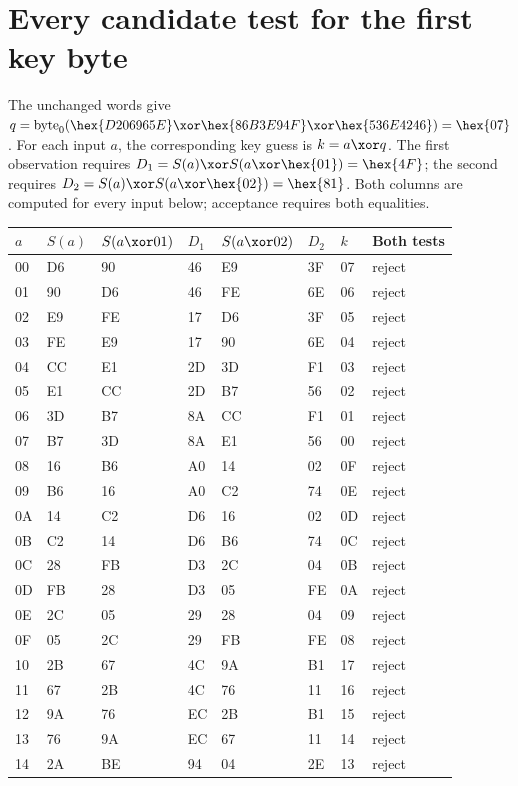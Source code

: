 \section{Every candidate test for the first key byte}
The unchanged words give $q=\operatorname{byte}_0(\hex{D206965E}\xor\hex{86B3E94F}\xor\hex{536E4246})=\hex{07}$. For each input $a$, the corresponding key guess is $k=a\xor q$. The first observation requires $D_1=S(a)\xor S(a\xor\hex{01})=\hex{4F}$; the second requires $D_2=S(a)\xor S(a\xor\hex{02})=\hex{81}$. Both columns are computed for every input below; acceptance requires both equalities.
\begingroup\small
\begin{longtable}{llllllll}
\toprule
$a$ & $S(a)$ & $S(a\xor01)$ & $D_1$ & $S(a\xor02)$ & $D_2$ & $k$ & Both tests\\\midrule
\endhead
00 & D6 & 90 & 46 & E9 & 3F & 07 & reject\\
01 & 90 & D6 & 46 & FE & 6E & 06 & reject\\
02 & E9 & FE & 17 & D6 & 3F & 05 & reject\\
03 & FE & E9 & 17 & 90 & 6E & 04 & reject\\
04 & CC & E1 & 2D & 3D & F1 & 03 & reject\\
05 & E1 & CC & 2D & B7 & 56 & 02 & reject\\
06 & 3D & B7 & 8A & CC & F1 & 01 & reject\\
07 & B7 & 3D & 8A & E1 & 56 & 00 & reject\\
08 & 16 & B6 & A0 & 14 & 02 & 0F & reject\\
09 & B6 & 16 & A0 & C2 & 74 & 0E & reject\\
0A & 14 & C2 & D6 & 16 & 02 & 0D & reject\\
0B & C2 & 14 & D6 & B6 & 74 & 0C & reject\\
0C & 28 & FB & D3 & 2C & 04 & 0B & reject\\
0D & FB & 28 & D3 & 05 & FE & 0A & reject\\
0E & 2C & 05 & 29 & 28 & 04 & 09 & reject\\
0F & 05 & 2C & 29 & FB & FE & 08 & reject\\
10 & 2B & 67 & 4C & 9A & B1 & 17 & reject\\
11 & 67 & 2B & 4C & 76 & 11 & 16 & reject\\
12 & 9A & 76 & EC & 2B & B1 & 15 & reject\\
13 & 76 & 9A & EC & 67 & 11 & 14 & reject\\
14 & 2A & BE & 94 & 04 & 2E & 13 & reject\\

\end{longtable}

